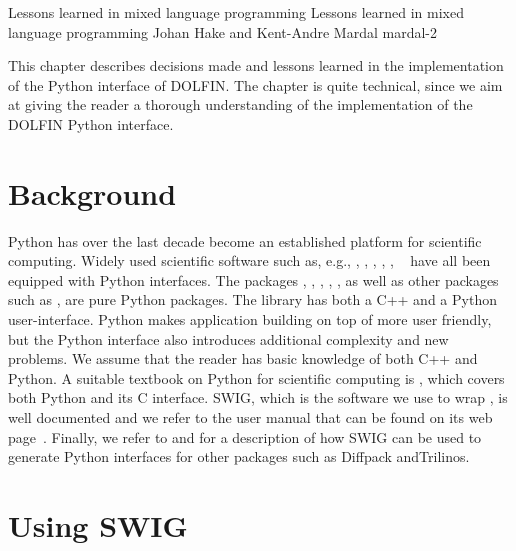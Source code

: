 \begingroup

\setcounter{chapter}{18}
\setcounter{chpnum}{18}

              {Lessons learned in mixed language programming}
              {Lessons learned in mixed language programming}
              {Johan Hake and Kent-Andre Mardal}
              {mardal-2}

This chapter describes decisions made and lessons learned in the
implementation of the Python interface of DOLFIN. The chapter is quite
technical, since we aim at giving the reader a thorough understanding
of the implementation of the DOLFIN Python interface.


\vspace*{6.5pt}
\section{Background}

Python has over the last decade become an established platform for
scientific computing. Widely used scientific software such as,
e.g., \citet{www:petsc}, \citet{www:hypre}, \citet{www:trilinos},
\citet{www:vtk}, \citet{www:vmtk}, \ginac~\citep{BauerFrinkKreckel2000}
have all been equipped with Python interfaces. The \fenics
packages \ferari, \fiat , \ffc, \ufl, \viper, as well as other
packages such as \sympy\citep{CertikSeoanePetersonEtAl2009},
\scipy\citep{JonesOliphantPetersonEtAl2009} are pure Python packages.
The \dolfin library has both a C++ and a Python user-interface. Python
makes application building on top of \dolfin more user friendly,
but the Python interface also introduces additional complexity and
new problems. We assume that the reader has basic knowledge of
both C++ and Python. A suitable textbook on Python for scientific
computing is \citet{Langtangen2008}, which covers both Python and its
C interface.  SWIG, which is the software we use to wrap \dolfin, is
well documented and we refer to the user manual that can be found on its
web page~\citep{www:swig}. Finally, we refer to \citet{Langtangen2003b}
and \citet{SalaSpotzHeroux2008} for a description of how SWIG can be
used to generate Python interfaces for other packages such as Diffpack
and\break Trilinos.

\vspace*{6.5pt}
\section{Using SWIG}

